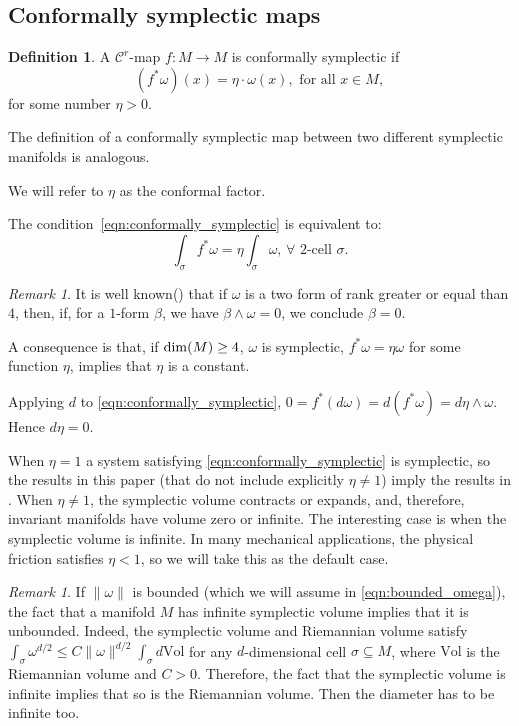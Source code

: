 \documentclass[11pt]{amsart}
\theoremstyle{definition}
\newtheorem{defn}[thm]{Definition}
\theoremstyle{remark}
\newtheorem{rem}[thm]{Remark}
\numberwithin{equation}{section}
\newcommand{\C}{\mathcal{C}}
\begin{document}
\subsection{Conformally symplectic maps}\label{sec:conf_symp}

\begin{defn}\label{def:conformally_symplectic}
A $\C^r$-map  $f: M \to M$
is   conformally symplectic if
\begin{equation}\label{eqn:conformally_symplectic}
  (f^*\omega)(x)=\eta\cdot\omega(x),\textrm { for all } x\in M,
\end{equation}
for some number  $\eta>0$.

The definition of a  conformally symplectic map between two different symplectic manifolds is analogous.
\end{defn}

We will refer to $\eta$ as the conformal factor.

The condition~\eqref{eqn:conformally_symplectic} is equivalent to:
\[
\int_\sigma f^* \omega
= \eta \int_{\sigma} \omega,\,\forall \textrm{ 2-cell } \sigma.
\]


\begin{rem}\label{rem:conformal_factor_constant}
  It is well known(\cite{LibermannM87,Banyaga02}) that
  if $\omega$ is a two form of rank greater or equal  than $4$,
  then, if, for a $1$-form $\beta$,
  we have $\beta \wedge \omega = 0$, we
  conclude $\beta = 0$.

  A consequence is that,
  if ${\rm dim}(M) \ge 4$,  $\omega$ is symplectic,
  $f^* \omega = \eta \omega$ for some function $\eta$,
  implies that  $\eta$ is a constant.

  Applying $d$ to \eqref{eqn:conformally_symplectic},  $0=f^*(d\omega)=d(f^*\omega)=d\eta\wedge \omega$.
  Hence $d\eta = 0$.
\end{rem}


When $\eta=1$ a system satisfying \eqref{eqn:conformally_symplectic} is symplectic, so the results in this paper (that do not include explicitly $\eta \ne 1$) imply the results in \cite{DLS08}.
When $\eta\neq 1$,  the symplectic  volume contracts or expands, and, therefore, invariant manifolds have volume zero or infinite.
The interesting case is when the symplectic  volume is infinite.
In many mechanical applications,
the physical friction satisfies
$\eta<1$, so we will take this as the default case.


\begin{rem}\label{rem:manifold_unbounded}
If $\|\omega\|$ is bounded (which we will assume in \eqref{eqn:bounded_omega}), the fact that a manifold $M$ has infinite symplectic  volume implies that it is unbounded.
 Indeed,  the symplectic volume and Riemannian volume satisfy
$ \int_\sigma\omega^{d/2} \le  C \|\omega\|^{d/2} \int_\sigma d\textrm{Vol}$
for any $d$-dimensional cell $\sigma \subseteq M$,  where $\textrm{Vol}$ is the Riemannian volume and $C>0$.
Therefore, the fact that the symplectic volume is infinite implies that so is  the Riemannian volume.
Then the diameter has to be infinite too.
\end{rem}
\end{document}
